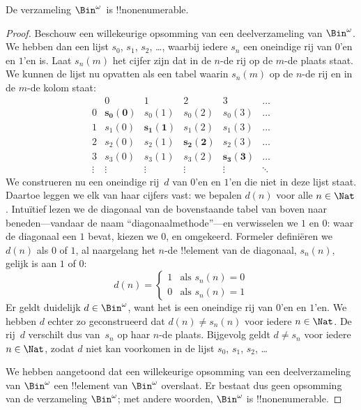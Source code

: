 \documentclass[openany]{memoir}
\begin{document}
\begin{thm}
De verzameling $\Bin^\omega$~is !!{nonenumerable}.
\end{thm}

\begin{proof}
Beschouw een willekeurige opsomming van een deelverzameling van
$\Bin^\omega$. We hebben dan een lijst $s_{0}$, $s_{1}$, $s_{2}$,
\dots{}, waarbij iedere $s_n$ een oneindige rij van $0$'en en $1$'en is.
Laat $s_n(m)$ het cijfer zijn dat in de $n$-de rij op de $m$-de plaats
staat.
We kunnen de lijst nu opvatten als een tabel waarin $s_n(m)$ op de
$n$-de rij en in de $m$-de kolom staat:
\[
\begin{array}{c|c|c|c|c|c}
& 0 & 1 & 2 & 3 & \dots \\\hline
0 & \mathbf{s_{0}(0)} & s_{0}(1) & s_{0}(2) & s_0(3) & \dots \\\hline
1 & s_{1}(0)& \mathbf{s_{1}(1)} & s_1(2) & s_1(3) & \dots \\\hline
2 & s_{2}(0)& s_{2}(1) & \mathbf{s_2(2)} & s_2(3) & \dots \\\hline
3 & s_{3}(0)& s_{3}(1) & s_3(2) & \mathbf{s_3(3)} & \dots \\\hline
\vdots & \vdots & \vdots & \vdots & \vdots & \mathbf{\ddots}
\end{array}
\]
We construeren nu een oneindige rij~$d$ van $0$'en en $1$'en die niet
in deze lijst staat. Daartoe leggen we elk van haar cijfers vast: we
bepalen $d(n)$ voor alle $n \in \Nat$. Intuïtief lezen we de diagonaal
van de bovenstaande tabel van boven naar beneden---vandaar de naam
``diagonaalmethode''---en verwisselen we $1$ en $0$: waar de diagonaal
een $1$ bevat, kiezen we $0$, en omgekeerd. Formeler definiëren we
$d(n)$ als $0$ of $1$,
al naargelang het $n$-de !!{element} van de diagonaal, $s_n(n)$, gelijk
is aan $1$ of $0$:
\[
d(n) =
\begin{cases}
1 & \text{als $s_{n}(n) = 0$}\\
0 & \text{als $s_{n}(n) = 1$}
\end{cases}
\]
Er geldt duidelijk $d \in \Bin^\omega$, want het is een oneindige rij
van $0$'en en $1$'en. We hebben $d$ echter zo geconstrueerd dat
$d(n) \neq s_n(n)$ voor iedere $n \in \Nat$. De rij~$d$ verschilt dus
van~$s_n$ op haar $n$-de plaats. Bijgevolg geldt $d \neq s_n$ voor
iedere $n\in \Nat$, zodat $d$ niet kan voorkomen in de lijst $s_0$,
$s_1$, $s_2$, \dots

We hebben aangetoond dat een willekeurige opsomming van een
deelverzameling van $\Bin^\omega$ een !!{element} van $\Bin^\omega$
overslaat. Er bestaat dus geen opsomming van de verzameling
$\Bin^\omega$; met andere woorden, $\Bin^\omega$ is
!!{nonenumerable}.
\end{proof}
\end{document}
